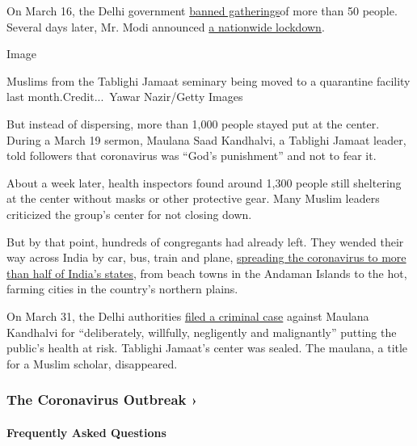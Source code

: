 On March 16, the Delhi government
\href{https://www.hindustantimes.com/cities/delhi-govt-bars-assembly-of-over-50-people-orders-shutdown-of-weekly-markets-gyms-clubs/story-OOddakgdnYeKRofgYatXFN.html}{banned
gatherings}of more than 50 people. Several days later, Mr. Modi
announced
\href{https://www.nytimes.com/2020/03/24/world/asia/india-coronavirus-lockdown.html}{a
nationwide lockdown}.

Image

Muslims from the Tablighi Jamaat seminary being moved to a quarantine
facility last month.Credit...~Yawar Nazir/Getty Images

But instead of dispersing, more than 1,000 people stayed put at the
center. During a March 19 sermon, Maulana Saad Kandhalvi, a Tablighi
Jamaat leader, told followers that coronavirus was ``God's punishment''
and not to fear it.

About a week later, health inspectors found around 1,300 people still
sheltering at the center without masks or other protective gear. Many
Muslim leaders criticized the group's center for not closing down.

But by that point, hundreds of congregants had already left. They wended
their way across India by car, bus, train and plane,
\href{https://www.businesstoday.in/latest/trends/coronavirus-1023-positive-cases-related-to-tablighi-jamat-reported-in-17-states/story/400188.html}{spreading
the coronavirus to more than half of India's states}, from beach towns
in the Andaman Islands to the hot, farming cities in the country's
northern plains.

On March 31, the Delhi authorities
\href{https://www.ibtimes.co.in/nizamuddin-markaz-chief-maulana-saad-6-others-booked-full-text-fir-816565}{filed
a criminal case} against Maulana Kandhalvi for ``deliberately,
willfully, negligently and malignantly'' putting the public's health at
risk. Tablighi Jamaat's center was sealed. The maulana, a title for a
Muslim scholar, disappeared.

\href{https://www.nytimes.com/news-event/coronavirus?action=click\&pgtype=Article\&state=default\&region=MAIN_CONTENT_3\&context=storylines_faq}{}

\hypertarget{the-coronavirus-outbreak-}{%
\subsubsection{The Coronavirus Outbreak
›}\label{the-coronavirus-outbreak-}}

\hypertarget{frequently-asked-questions}{%
\paragraph{Frequently Asked
Questions}\label{frequently-asked-questions}}

